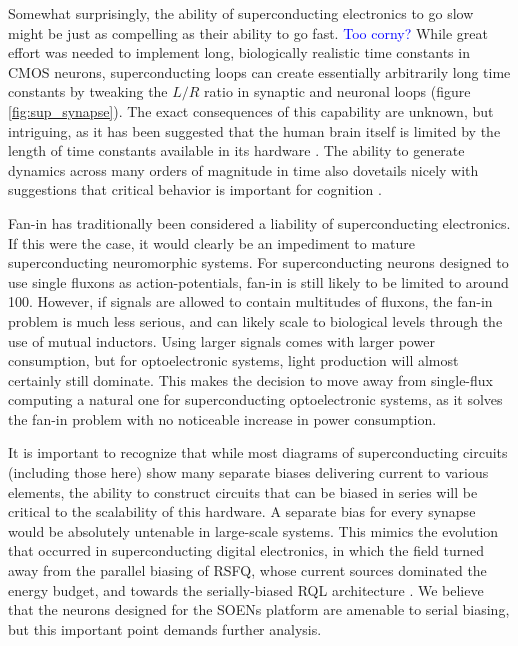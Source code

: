 \documentclass[twocolumn]{article}
\begin{document}
Somewhat surprisingly, the ability of superconducting electronics to go slow might be just as compelling as their ability to go fast. \textcolor{blue}{Too corny?} While great effort was needed to implement long, biologically realistic time constants in CMOS neurons, superconducting loops can create essentially arbitrarily long time constants by tweaking the $L/R$ ratio in synaptic and neuronal loops (figure \ref{fig:sup_synapse}). The exact consequences of this capability are unknown, but intriguing, as it has been suggested that the human brain itself is limited by the length of time constants available in its hardware \cite{indiveri2019importance}. The ability to generate dynamics across many orders of magnitude in time also dovetails nicely with suggestions that critical behavior is important for cognition \cite{cocchi2017criticality}.

Fan-in has traditionally been considered a liability of superconducting electronics. If this were the case, it would clearly be an impediment to mature superconducting neuromorphic systems. For superconducting neurons designed to use single fluxons as action-potentials, fan-in is still likely to be limited to around 100\cite{schneider2020fan}. However, if signals are allowed to contain multitudes of fluxons, the fan-in problem is much less serious, and can likely scale to biological levels through the use of mutual inductors. Using larger signals comes with larger power consumption, but for optoelectronic systems, light production will almost certainly still dominate. This makes the decision to move away from single-flux computing a natural one for superconducting optoelectronic systems, as it solves the fan-in problem with no noticeable increase in power consumption.

It is important to recognize that while most diagrams of superconducting circuits (including those here) show many separate biases delivering current to various elements, the ability to construct circuits that can be biased in series will be critical to the scalability of this hardware. A separate bias for every synapse would be absolutely untenable in large-scale systems. This mimics the evolution that occurred in superconducting digital electronics, in which the field turned away from the parallel biasing of RSFQ, whose current sources dominated the energy budget, and towards the serially-biased RQL architecture \cite{tolpygo2016superconductor}. We believe that the neurons designed for the SOENs platform are amenable to serial biasing, but this important point demands further analysis.
\end{document}
